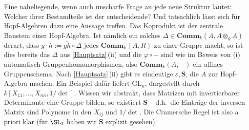\documentclass[11pt]{article}
\newcommand{\Comm}{\mathbf{Comm}}
\newcommand{\Sbold}{\mathbf{S}}
\begin{document}
\begin{note} Eine naheliegende, wenn auch unscharfe Frage an jede neue Struktur lautet: Welcher ihrer Bestandteile ist der entscheidende?
    Und tatsächlich lässt sich für Hopf-Algebren dazu eine Aussage treffen. Das Koprodukt ist der zentrale Baustein 
    einer Hopf-Algebra. Ist nämlich ein solches $\Delta\in\Comm_k(A,A\otimes_k A)$ derart, dass $g\cdot h := \overline{gh}\circ\Delta$ jedes $\Comm_k(A,R)$ zu einer Gruppe macht, so
    ist dies bereits das $\Delta$ aus \ref{Hauptsatz}\,(ii) und die $\varphi\circ-$ sind wie im Beweis von (i) automatisch Gruppenhomomorphismen, also $\Comm_k(A,-)$ ein affines
    Gruppenschema. Nach \ref{Hauptsatz}\,(ii) gibt es eindeutige $\varepsilon,\Sbold$, die $A$ zur Hopf-Algebra machen.
    Ein Beispiel dafür liefert $\mathrm{GL}_n$, dargestellt durch $k[X_{11},\dots,X_{nn},1/\det]$. Wissen wir abstrakt, dass Matrizen mit
    invertierbarer Determinante eine Gruppe bilden, so existiert $\Sbold$ -- d.h.\ die Einträge der inversen Matrix sind
    Polynome in den $X_{ij}$ und $1/\det$. Die Cramersche Regel ist also a priori klar (für $\SL_2$ haben wir $\Sbold$ explizit gesehen).
\end{note}
\end{document}
